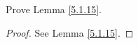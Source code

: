\exercisesection

\begin{exercise}\label{ex 5.1.1}
    Prove Lemma \ref{5.1.15}.
\end{exercise}

\begin{proof}
    See Lemma \ref{5.1.15}.
\end{proof}
